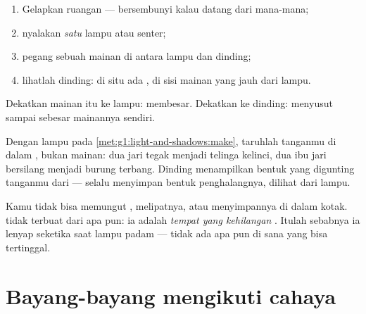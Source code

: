 \begin{method}\label{met:g1:light-and-shadows:make}
\begin{enumerate}
  \item Gelapkan ruangan ---  bersembunyi kalau 
        datang dari mana-mana;
  \item nyalakan \emph{satu} lampu atau senter;
  \item pegang sebuah mainan di antara lampu dan dinding;
  \item lihatlah dinding: di situ ada , di sisi mainan
        yang jauh dari lampu.
\end{enumerate}
Dekatkan mainan itu ke lampu:  membesar. Dekatkan ke
dinding:  menyusut sampai sebesar mainannya sendiri.
\end{method}

\begin{example}\label{ex:g1:light-and-shadows:animals}
Dengan lampu pada \cref{met:g1:light-and-shadows:make}, taruhlah
tanganmu di dalam , bukan mainan: dua jari tegak menjadi telinga
kelinci, dua ibu jari bersilang menjadi burung terbang. Dinding
menampilkan bentuk yang digunting tanganmu dari  ---
 selalu menyimpan bentuk penghalangnya, dilihat dari
lampu.
\end{example}

\begin{remark}\label{rem:g1:light-and-shadows:notathing}
Kamu tidak bisa memungut , melipatnya, atau menyimpannya
di dalam kotak.  tidak terbuat dari apa pun: ia adalah
\emph{tempat yang kehilangan }. Itulah sebabnya ia lenyap
seketika saat lampu padam --- tidak ada apa pun di sana yang bisa
tertinggal.
\end{remark}

\section{Bayang-bayang mengikuti cahaya}

